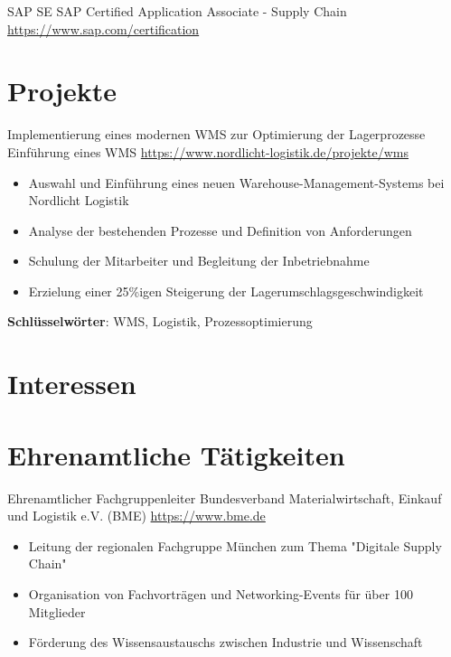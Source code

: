 \documentclass[a4paper, serif, 10pt]{moderncv}
\begin{document}
        {SAP SE}
        {SAP Certified Application Associate - Supply Chain}
        {\url{https://www.sap.com/certification}}
        {}
        {}
\section{Projekte}

        {Implementierung eines modernen WMS zur Optimierung der Lagerprozesse}
        {Einführung eines WMS}
        {\url{https://www.nordlicht-logistik.de/projekte/wms}}
        {}
        {\begin{itemize}
\item Auswahl und Einführung eines neuen Warehouse-Management-Systems bei Nordlicht Logistik
\item Analyse der bestehenden Prozesse und Definition von Anforderungen
\item Schulung der Mitarbeiter und Begleitung der Inbetriebnahme
\item Erzielung einer 25\%igen Steigerung der Lagerumschlagsgeschwindigkeit
\end{itemize}
\textbf{Schlüsselwörter}: WMS, Logistik, Prozessoptimierung}
\section{Interessen}

\section{Ehrenamtliche Tätigkeiten}

        {Ehrenamtlicher Fachgruppenleiter}
        {Bundesverband Materialwirtschaft, Einkauf und Logistik e.V. (BME)}
        {\url{https://www.bme.de}}
        {}
        {\begin{itemize}
\item Leitung der regionalen Fachgruppe München zum Thema "Digitale Supply Chain"
\item Organisation von Fachvorträgen und Networking-Events für über 100 Mitglieder
\item Förderung des Wissensaustauschs zwischen Industrie und Wissenschaft
\end{itemize}}
    
\end{document}
